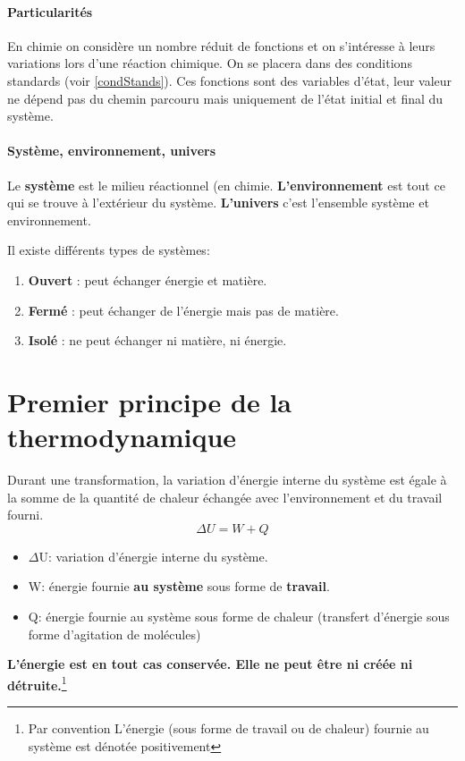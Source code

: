 \documentclass[10pt,a4paper]{book}
\begin{document}
\paragraph{Particularités} En chimie on  considère un nombre réduit de fonctions et on s'intéresse à leurs variations lors d'une réaction chimique. On se placera dans des conditions standards (voir \ref{condStands}). Ces fonctions sont des variables d'état, leur valeur ne dépend pas du chemin parcouru mais uniquement de l'état initial et final du système.
\paragraph{Système, environnement, univers} Le \textbf{système} est le milieu réactionnel (en chimie. \textbf{L'environnement} est tout ce qui se trouve à l'extérieur du système. \textbf{L'univers} c'est l'ensemble système et environnement. \par 
Il existe différents types de systèmes: 
\begin{enumerate}
\item \textbf{Ouvert} : peut échanger énergie et matière.
\item \textbf{Fermé} : peut échanger de l'énergie  mais pas de matière.
\item \textbf{Isolé} : ne peut échanger ni matière, ni énergie.
\end{enumerate}

\section{Premier principe de la thermodynamique}

\par Durant une transformation, la variation d'énergie interne du système est égale
à la somme de la quantité de chaleur échangée avec l'environnement
et du travail fourni.
\begin{displaymath}
\Delta U = W + Q
\end{displaymath}
\begin{itemize}
\item $\Delta$U: variation d'énergie interne du système.
\item W: énergie fournie \textbf{au système} sous forme de \textbf{travail}.
\item Q: énergie fournie au système sous forme de chaleur (transfert d'énergie sous forme d'agitation de molécules)
\end{itemize}
\textbf{L'énergie est en tout cas conservée. Elle ne peut être ni créée ni détruite.}\footnote{Par convention L'énergie (sous forme de travail ou de chaleur) fournie au système est dénotée positivement}
\end{document}
